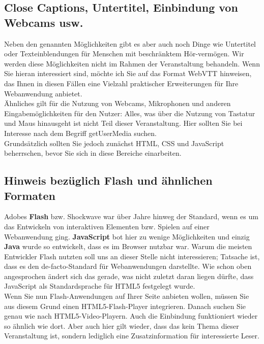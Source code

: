 \subsection{Close Captions, Untertitel, Einbindung von Webcams usw.}

Neben den genannten Möglichkeiten gibt es aber auch noch Dinge wie Untertitel oder Texteinblendungen für Menschen mit beschränktem Hör-vermögen. Wir werden diese Möglichkeiten nicht im Rahmen der Veranstaltung behandeln. Wenn Sie hieran interessiert sind, möchte ich Sie auf das Format WebVTT hinweisen, das Ihnen in diesen Fällen eine Vielzahl praktischer Erweiterungen für Ihre Webanwendung anbietet.\\

Ähnliches gilt für die Nutzung von Webcams, Mikrophonen und anderen Eingabemöglichkeiten für den Nutzer: Alles, was über die Nutzung von Tastatur und Maus hinausgeht ist nicht Teil dieser Veranstaltung. Hier sollten Sie bei Interesse nach dem Begriff getUserMedia suchen.\\

Grundsätzlich sollten Sie jedoch zunächst HTML, CSS und JavaScript beherrschen, bevor Sie sich in diese Bereiche einarbeiten.

\subsection{Hinweis bezüglich Flash und ähnlichen Formaten}

Adobes \textbf{Flash} bzw. Shockwave war über Jahre hinweg der Standard, wenn es um das Entwickeln von interaktiven Elementen bzw. Spielen auf einer Webanwendung ging. \textbf{JavaScript} bot hier zu wenige Möglichkeiten und einzig \textbf{Java} wurde so entwickelt, dass es im Browser nutzbar war. Warum die meisten Entwickler Flash nutzten soll uns an dieser Stelle nicht interessieren; Tatsache ist, dass es den de-facto-Standard für Webanwendungen darstellte. Wie schon oben angesprochen ändert sich das gerade, was nicht zuletzt daran liegen dürfte, dass JavaScript als Standardsprache für HTML5 festgelegt wurde. \\

Wenn Sie nun Flash-Anwendungen auf Ihrer Seite anbieten wollen, müssen Sie aus diesem Grund einen HTML5-Flash-Player integrieren. Danach suchen Sie genau wie nach HTML5-Video-Playern. Auch die Einbindung funktioniert wieder so ähnlich wie dort. Aber auch hier gilt wieder, dass das kein Thema dieser Veranstaltung ist, sondern lediglich eine Zusatzinformation für interessierte Leser.\\

